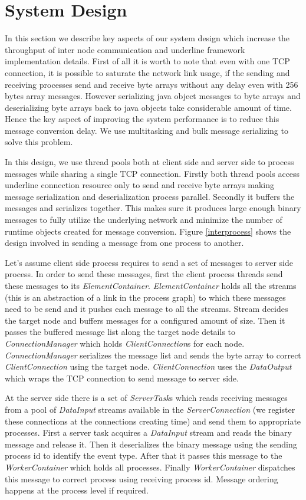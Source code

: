 \section{System Design}
In this section we describe key aspects of our system design which increase the throughput of inter node communication and underline framework implementation details. First of all it is worth to note that even with one TCP connection, it is possible to saturate the network link usage, if the sending and receiving processes send and receive byte arrays without any delay even with 256 bytes array messages. However serializing java object messages to byte arrays and deserializing byte arrays back to java objects take considerable amount of time. Hence the key aspect of  improving the system performance is to reduce this message conversion delay. We use multitasking and bulk message serializing to solve this problem.

In this design, we use thread pools both at client side and server side to process messages while sharing a single TCP connection. Firstly both thread pools access underline connection resource only to send and receive byte arrays making message serialization and deserialization process parallel. Secondly it buffers the messages and serializes together.  This makes sure it produces large enough binary messages to fully utilize the underlying network and minimize the number of runtime objects created for message conversion. Figure \ref{interprocess} shows the design involved in sending a message from one process to another. 

Let's assume client side process requires to send a set of messages to server side process. In order to send these messages, first the client process threads send these messages to its \textit{ElementContainer}. \textit{ElementContainer} holds all the streams (this is an abstraction of a link in the process graph) to which these messages need to be send and it pushes each message to all the streams. Stream decides the target node and buffers messages for a configured amount of size. Then it passes the buffered  message list along the target node details to \textit{ConnectionManager} which holds \textit{ClientConnection}s for each node. \textit{ConnectionManager} serializes the message list and sends the byte array to correct \textit{ClientConnection} using the target node. \textit{ClientConnection} uses the \textit{DataOutput} which wraps the TCP connection to send message to server side. 

At the server side there is a set of \textit{ServerTask}s which reads receiving messages from a pool of \textit{DataInput} streams available in the \textit{ServerConnection} (we register these connections at the connections creating time) and send them to appropriate processes. First a server task acquires a \textit{DataInput} stream and reads the binary message and release it. Then it deserializes the binary message using the sending process id to identify the event type.  After that it passes this message to the \textit{WorkerContainer} which holds all processes. Finally \textit{WorkerContainer} dispatches this message to correct process using receiving process id. Message ordering happens at the process level if required. 

